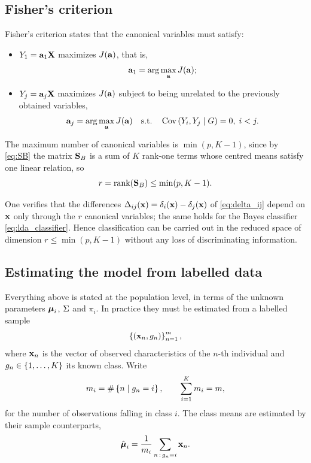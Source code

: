 \subsection{Fisher's criterion}
\label{subsec:fisher_criterion}

Fisher's criterion states that the canonical variables must satisfy:
\begin{itemize}
  \item $Y_1=\mathbf{a}_1\mathbf{X}$ maximizes $J(\mathbf{a})$, that is,
        \begin{equation}
          \label{eq:fisher_first}
          \mathbf{a}_1=\arg\max_{\mathbf{a}} J(\mathbf{a});
        \end{equation}
  \item $Y_j=\mathbf{a}_j\mathbf{X}$ maximizes $J(\mathbf{a})$ subject to being unrelated
        to the previously obtained variables,
        \begin{equation}
          \label{eq:fisher_jth}
          \mathbf{a}_j=\arg\max_{\mathbf{a}} J(\mathbf{a})
          \quad\text{s.t.}\quad
          \operatorname{Cov}\left( Y_i,Y_j\mid G \right)=0,\; i<j .
        \end{equation}
\end{itemize}

The maximum number of canonical variables is $\min(p,K-1)$, since by
\eqref{eq:SB} the matrix $\mathbf{S}_B$ is a sum of $K$ rank-one terms whose
centred means satisfy one linear relation, so
\begin{equation}
  \label{eq:rank_SB}
  r=\operatorname{rank}(\mathbf{S}_B)\le\min(p,K-1).
\end{equation}

One verifies that the differences $\Delta_{ij}(\mathbf{x})=\delta_i(\mathbf{x})-\delta_j(\mathbf{x})$
of \eqref{eq:delta_ij} depend on $\mathbf{x}$ only through the $r$ canonical
variables; the same holds for the Bayes classifier \eqref{eq:lda_classifier}.
Hence classification can be carried out in the reduced space of dimension
$r\le\min(p,K-1)$ without any loss of discriminating information.

\subsection{Estimating the model from labelled data}
\label{subsec:lda_estimation}

Everything above is stated at the population level, in terms of the unknown
parameters $\boldsymbol{\mu}_i$, $\Sigma$ and $\pi_i$. In practice they must be estimated from a
labelled sample
\begin{equation}
  \label{eq:labelled_sample}
  \left\{ (\mathbf{x}_n,g_n) \right\}_{n=1}^{m},
\end{equation}
where $\mathbf{x}_n$ is the vector of observed characteristics of the $n$-th
individual and $g_n\in\left\{ 1,\dots,K \right\}$ its known class. Write
\begin{equation}
  \label{eq:class_counts}
  m_i=\#\left\{ n\mid g_n=i \right\},
  \qquad \sum_{i=1}^{K}m_i=m,
\end{equation}
for the number of observations falling in class $i$. The class means are
estimated by their sample counterparts,
\begin{equation}
  \label{eq:mean_hat}
  \hat{\boldsymbol{\mu}}_i=\frac{1}{m_i}\sum_{n\,:\,g_n=i}\mathbf{x}_n .
\end{equation}

